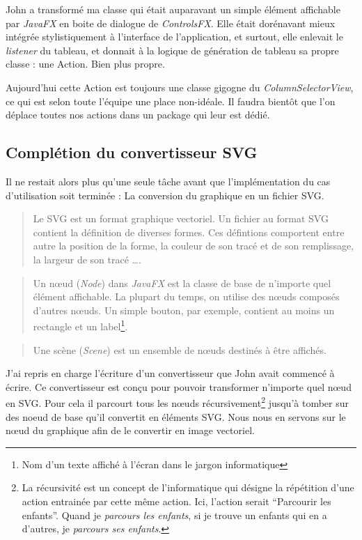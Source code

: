 John a transformé ma classe qui était auparavant un simple élément affichable par \textit{JavaFX} en boite de dialogue de \textit{ControlsFX}. Elle était dorénavant mieux intégrée stylistiquement à l'interface de l'application, et surtout, elle enlevait le \textit{listener} du tableau, et donnait à la logique de génération de tableau sa propre classe : une Action. Bien plus propre.

Aujourd'hui cette Action est toujours une classe gigogne du \textit{ColumnSelectorView}, ce qui est selon toute l'équipe une place non-idéale. Il faudra bientôt que l'on déplace toutes nos actions dans un package qui leur est dédié.

%
%
\subsection{Complétion du convertisseur SVG}
Il ne restait alors plus qu'une seule tâche avant que l'implémentation du cas d'utilisation soit terminée : La conversion du graphique en un fichier SVG.

\begin{quote}
Le SVG est un format graphique vectoriel. Un fichier au format SVG contient la définition de diverses formes. Ces défintions comportent entre autre la position de la forme, la couleur de son tracé et de son remplissage, la largeur de son tracé \ldots.
\end{quote}

\begin{quote}
Un nœud (\textit{Node}) dans \textit{JavaFX} est la classe de base de n'importe quel élément affichable. La plupart du temps, on utilise des nœuds composés d'autres nœuds. Un simple bouton, par exemple, contient au moins un rectangle et un label\footnote{Nom d'un texte affiché à l'écran dans le jargon informatique}.
\end{quote}

\begin{quote}
Une scène (\textit{Scene}) est un ensemble de nœuds destinés à être affichés.
\end{quote}

J'ai repris en charge l'écriture d'un convertisseur que John avait commencé à écrire. Ce convertisseur est conçu pour pouvoir transformer n'importe quel nœud en SVG. Pour cela il parcourt tous les nœuds récursivement\footnote{La récursivité est un concept de l'informatique qui désigne la répétition d'une action entrainée par cette même action. Ici, l'action serait ``Parcourir les enfants''. Quand je \emph{parcours les enfants}, si je trouve un enfants qui en a d'autres, je \emph{parcours ses enfants}.} jusqu'à tomber sur des noeud de base qu'il convertit en éléments SVG. Nous nous en servons sur le nœud du graphique afin de le convertir en image vectoriel.

